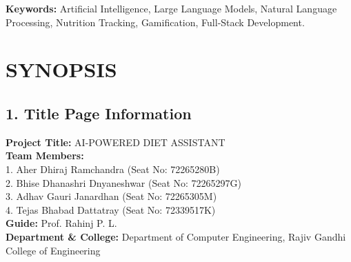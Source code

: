 \documentclass[12pt,a4paper]{report}
\begin{document}
\vspace{12pt}

\noindent \textbf{Keywords:} Artificial Intelligence, Large Language Models, Natural Language Processing, Nutrition Tracking, Gamification, Full-Stack Development.

\newpage
\section*{\centering SYNOPSIS}
\vspace{8mm}
\justifying

\subsection*{1. Title Page Information}
\textbf{Project Title:} AI-POWERED DIET ASSISTANT\\[4pt]
\textbf{Team Members:}\\
1. Aher Dhiraj Ramchandra (Seat No: 72265280B)\\
2. Bhise Dhanashri Dnyaneshwar (Seat No: 72265297G)\\
3. Adhav Gauri Janardhan (Seat No: 72265305M)\\
4. Tejas Bhabad Dattatray (Seat No: 72339517K)\\[4pt]
\textbf{Guide:} Prof. Rahinj P. L.\\[4pt]
\textbf{Department \& College:} Department of Computer Engineering, Rajiv Gandhi College of Engineering
\end{document}
